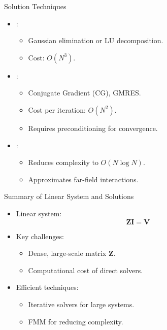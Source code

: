 \begin{frame}{Solution Techniques}
    \begin{itemize}
        \item {}:
            \begin{itemize}
                \item Gaussian elimination or LU decomposition.
                \item Cost: \(O(N^3)\).
            \end{itemize}
        \item {}:
            \begin{itemize}
                \item Conjugate Gradient (CG), GMRES.
                \item Cost per iteration: \(O(N^2)\).
                \item Requires preconditioning for convergence.
            \end{itemize}
        \item {}:
            \begin{itemize}
                \item Reduces complexity to \(O(N \log N)\).
                \item Approximates far-field interactions.
            \end{itemize}
    \end{itemize}
\end{frame}

\begin{frame}{Summary of Linear System and Solutions}
    \begin{itemize}
        \item Linear system: 
            \begin{equation}
            \mathbf{Z} \mathbf{I} = \mathbf{V} \tag{1}
            \end{equation}
        \item Key challenges:
            \begin{itemize}
                \item Dense, large-scale matrix \(\mathbf{Z}\).
                \item Computational cost of direct solvers.
            \end{itemize}
        \item Efficient techniques:
            \begin{itemize}
                \item Iterative solvers for large systems.
                \item FMM for reducing complexity.
            \end{itemize}
    \end{itemize}
\end{frame}

